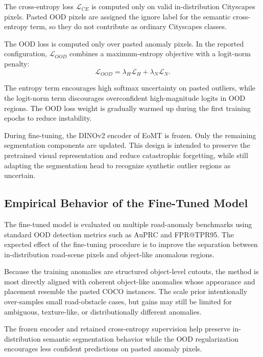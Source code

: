 The cross-entropy loss $\mathcal{L}_{CE}$ is computed only on valid
in-distribution Cityscapes pixels. Pasted OOD pixels are assigned the ignore
label for the semantic cross-entropy term, so they do not contribute as ordinary
Cityscapes classes.

The OOD loss is computed only over pasted anomaly pixels. In the reported
configuration, $\mathcal{L}_{OOD}$ combines a maximum-entropy objective with a
logit-norm penalty:
\begin{equation}
\mathcal{L}_{OOD}
=
\lambda_H \mathcal{L}_{H}
+
\lambda_N \mathcal{L}_{N}.
\end{equation}

The entropy term encourages high softmax uncertainty on pasted outliers, while
the logit-norm term discourages overconfident high-magnitude logits in OOD
regions. The OOD loss weight is gradually warmed up during the first training
epochs to reduce instability.

During fine-tuning, the DINOv2 encoder of EoMT is frozen. Only the remaining
segmentation components are updated. This design is intended to preserve the
pretrained visual representation and reduce catastrophic forgetting, while still
adapting the segmentation head to recognize synthetic outlier regions as
uncertain.

\subsection{Empirical Behavior of the Fine-Tuned Model}

The fine-tuned model is evaluated on multiple road-anomaly benchmarks using
standard OOD detection metrics such as AuPRC and FPR@TPR95. The expected effect
of the fine-tuning procedure is to improve the separation between
in-distribution road-scene pixels and object-like anomalous regions.

Because the training anomalies are structured object-level cutouts, the method is
most directly aligned with coherent object-like anomalies whose appearance and
placement resemble the pasted COCO instances. The scale prior intentionally
over-samples small road-obstacle cases, but gains may still be limited for
ambiguous, texture-like, or distributionally different anomalies.

The frozen encoder and retained cross-entropy supervision help preserve
in-distribution semantic segmentation behavior while the OOD regularization
encourages less confident predictions on pasted anomaly pixels.

